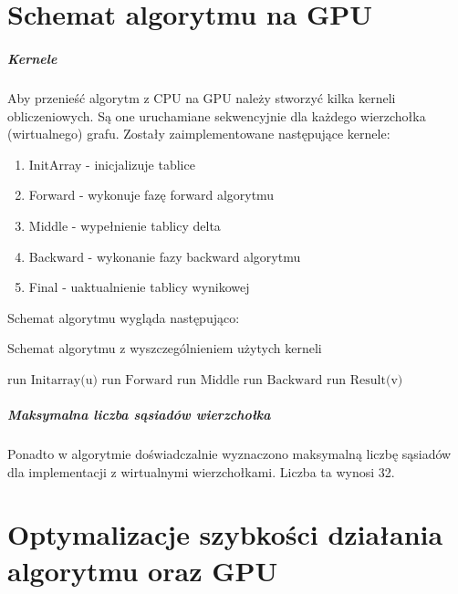 \documentclass[oneside]{book}
\begin{document}
\chapter{Schemat algorytmu na GPU}

\paragraph{Kernele} Aby przenieść algorytm z CPU na GPU należy stworzyć kilka kerneli obliczeniowych. Są one uruchamiane sekwencyjnie dla każdego wierzchołka (wirtualnego) grafu. Zostały zaimplementowane następujące kernele:
\begin{enumerate}
\item InitArray - inicjalizuje tablice
\item Forward - wykonuje fazę forward algorytmu
\item Middle - wypełnienie tablicy delta
\item Backward - wykonanie fazy backward algorytmu
\item Final - uaktualnienie tablicy wynikowej
\end{enumerate} 

Schemat algorytmu wygląda następująco:
 \begin{algorithm}[H]                                                            
   \caption{Schemat algorytmu z wyszczególnieniem użytych kerneli}\label{euclid}
   \begin{algorithmic}[1]
     \State $\text{run Initarray(u)}$
     \State $\text{run Forward}$
     \State $\text{run Middle}$
     \State $\text{run Backward}$
     \State $\text{run Result(v)}$
     \EndFor                                            
  \end{algorithmic}                                                             
\end{algorithm} 

\paragraph{Maksymalna liczba sąsiadów wierzchołka}
Ponadto w algorytmie doświadczalnie wyznaczono maksymalną liczbę sąsiadów dla implementacji z wirtualnymi wierzchołkami. Liczba ta wynosi 32.


\chapter{Optymalizacje szybkości działania algorytmu oraz GPU}
\end{document}
